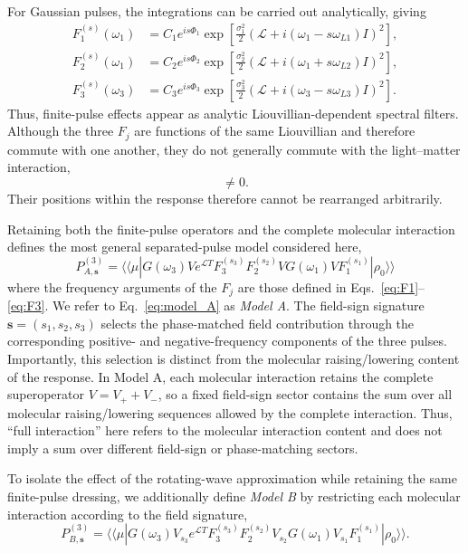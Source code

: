 For Gaussian pulses, the integrations can be carried out analytically,
giving
%
\begin{align}
F_1^{(s)}(\omega_1)
&=
C_1 e^{is\Phi_1}
\exp\left[
\frac{\sigma_1^2}{2}
\left(
\mathcal{L}
+
i(\omega_1-s\omega_{L1})I
\right)^2
\right],
\label{eq:F1_gaussian}
\\
F_2^{(s)}(\omega_1)
&=
C_2 e^{is\Phi_2}
\exp\left[
\frac{\sigma_2^2}{2}
\left(
\mathcal{L}
+
i(\omega_1+s\omega_{L2})I
\right)^2
\right],
\label{eq:F2_gaussian}
\\
F_3^{(s)}(\omega_3)
&=
C_3 e^{is\Phi_3}
\exp\left[
\frac{\sigma_3^2}{2}
\left(
\mathcal{L}
+
i(\omega_3-s\omega_{L3})I
\right)^2
\right].
\label{eq:F3_gaussian}
\end{align}
%
Thus, finite-pulse effects appear as analytic Liouvillian-dependent
spectral filters. Although the three $F_j$ are functions of the same
Liouvillian and therefore commute with one another,
they do not generally commute with the light--matter interaction,
%
\begin{equation}
[F_j,V]\neq 0.
\label{eq:FV_noncommute}
\end{equation}
%
Their positions within the response therefore cannot be rearranged
arbitrarily.

Retaining both the finite-pulse operators and the complete molecular
interaction defines the most general separated-pulse model considered
here,
%
\begin{equation}
\boxed{
P_{A,\mathbf{s}}^{(3)}
=
\langle\!\langle\mu|
G(\omega_3)
V
e^{\mathcal{L}T}
F_3^{(s_3)}
F_2^{(s_2)}
V
G(\omega_1)
V
F_1^{(s_1)}
|\rho_0\rangle\!\rangle
}
\label{eq:model_A}
\end{equation}
%
where the frequency arguments of the $F_j$ are those defined in
Eqs.~\eqref{eq:F1}--\eqref{eq:F3}. We refer to
Eq.~\eqref{eq:model_A} as \emph{Model A}. The field-sign signature $\mathbf{s}=(s_1,s_2,s_3)$ selects the
phase-matched field contribution through the corresponding
positive- and negative-frequency components of the three pulses.
Importantly, this selection is distinct from the molecular
raising/lowering content of the response. In Model A, each molecular
interaction retains the complete superoperator
$V=V_{+}+V_{-}$, so a fixed field-sign sector contains the sum over
all molecular raising/lowering sequences allowed by the complete
interaction. Thus, ``full interaction'' here refers to the molecular
interaction content and does not imply a sum over different
field-sign or phase-matching sectors.

To isolate the effect of the rotating-wave approximation while
retaining the same finite-pulse dressing, we additionally define
\emph{Model B} by restricting each molecular interaction according to
the field signature,
%
\begin{equation}
P_{B,\mathbf{s}}^{(3)}
=
\langle\!\langle\mu|
G(\omega_3)
V_{s_3}
e^{\mathcal{L}T}
F_3^{(s_3)}
F_2^{(s_2)}
V_{s_2}
G(\omega_1)
V_{s_1}
F_1^{(s_1)}
|\rho_0\rangle\!\rangle .
\label{eq:model_B}
\end{equation}

